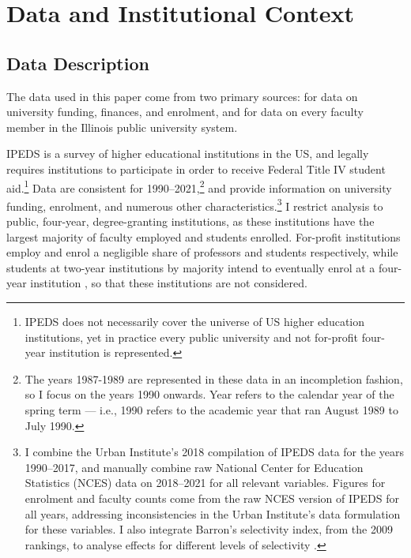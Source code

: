 \section{Data and Institutional Context}
\label{sec:data}

\subsection{Data Description}
\label{sec:data-desc}
The data used in this paper come from two primary sources: \citet[IPEDS]{ipeds} for data on university funding, finances, and enrolment, and \citet[IBHED]{ibhed} for data on every faculty member in the Illinois public university system.

IPEDS is a survey of higher educational institutions in the US, and legally requires institutions to participate in order to receive Federal Title IV student aid.\footnote{
    IPEDS does not necessarily cover the universe of US higher education institutions, yet in practice every public university and not for-profit four-year institution is represented.
}
Data are consistent for 1990--2021,\footnote{
    The years 1987-1989 are represented in these data in an incompletion fashion, so I focus on the years 1990 onwards.
    Year refers to the calendar year of the spring term --- i.e., 1990 refers to the academic year that ran August 1989 to July 1990.
}
and provide information on university funding, enrolment, and numerous other characteristics.\footnote{
    I combine the Urban Institute's 2018 compilation of IPEDS data for the years 1990--2017, and manually combine raw National Center for Education Statistics (NCES) data on 2018--2021 for all relevant variables.
    Figures for enrolment and faculty counts come from the raw NCES version of IPEDS for all years, addressing inconsistencies in the Urban Institute's data formulation for these variables.
    I also integrate Barron's selectivity index, from the 2009 rankings, to analyse effects for different levels of selectivity \citep{barrons2009}.
}
I restrict analysis to public, four-year, degree-granting institutions, as these institutions have the largest majority of faculty employed and students enrolled.
For-profit institutions employ and enrol a negligible share of professors and students respectively, while students at two-year institutions by majority intend to eventually enrol at a four-year institution \citep{mountjoy2022}, so that these institutions are not considered.
